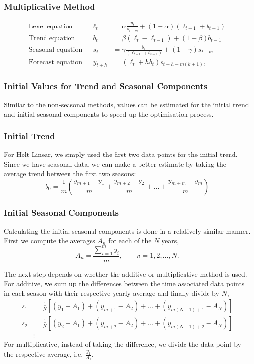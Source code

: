 \documentclass{article}
\begin{document}
  \subsubsection{Multiplicative Method}
  \begin{align*}
    \text{Level equation}   &&\ell_{t} &= \alpha \frac{y_{t}}{s_{t-m}} + (1 - \alpha)(\ell_{t-1} + b_{t-1})\\
    \text{Trend equation}   &&b_{t} &= \beta(\ell_{t}-\ell_{t-1}) + (1 - \beta)b_{t-1}\\
    \text{Seasonal equation}   &&s_{t} &= \gamma \frac{y_{t}}{(\ell_{t-1} + b_{t-1})} + (1 - \gamma)s_{t-m}\\
    \text{Forecast equation}   &&\hat{y}_{t+h} &= (\ell_{t} + hb_{t})s_{t+h-m(k+1)},
  \end{align*}

  \subsubsection{Initial Values for Trend and Seasonal Components}
  Similar to the non-seasonal methods, values can be estimated for the initial trend and initial seasonal components to speed up the optimisation process.

  \subsubsection*{Initial Trend}
  For Holt Linear, we simply used the first two data points for the initial trend. Since we have seasonal data, we can make a better estimate by taking the average trend between the first two seasons:
  \begin{equation*}
    b_0 = \frac{1}{m}\left(\frac{y_{m+1}-y_1}{m} + \frac{y_{m+2}-y_2}{m} + ... + \frac{y_{m+m}-y_m}{m}\right)
  \end{equation*}

  \subsubsection*{Initial Seasonal Components}
  Calculating the initial seasonal components is done in a relatively similar manner. First we compute the averages $A_n$ for each of the $N$ years,
  \begin{equation*}
    A_n = \frac{\sum_{i=1}^m{y_i}}{m}, \qquad n=1,2,...,N.
  \end{equation*}

  The next step depends on whether the additive or multiplicative method is used. For additive, we sum up the differences between the time associated data points in each season with their respective yearly average and finally divide by $N$,
  \begin{align*}
    s_1 &= \frac{1}{N}\left[(y_1-A_1) + (y_{m+1}-A_2) + ... + (y_{m(N-1)+1}-A_N)\right]\\
    s_2 &= \frac{1}{N}\left[(y_2-A_1) +( y_{m+2}-A_2) + ... + (y_{m(N-1)+2}-A_N)\right]\\
    &\vdots
  \end{align*}
  For multiplicative, instead of taking the difference, we divide the data point by the respective average, i.e. $\frac{y_1}{A_1}$.
  \newpage
\end{document}
